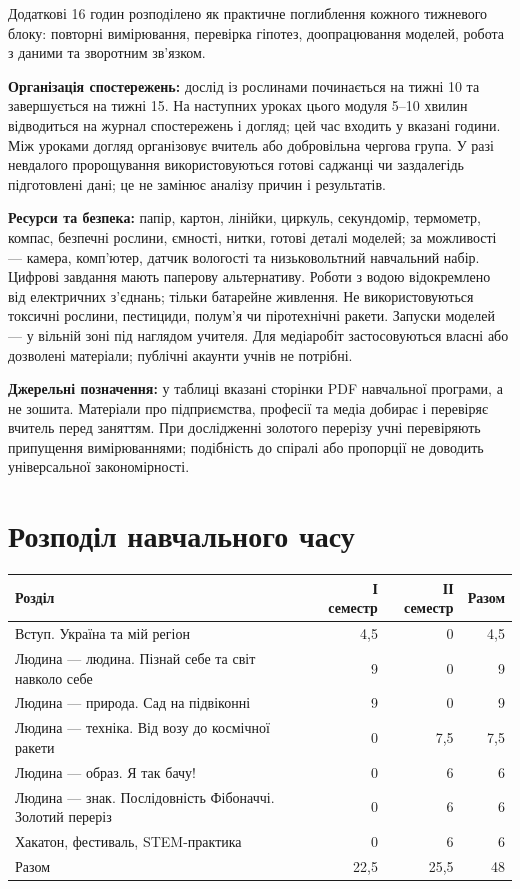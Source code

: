 \documentclass[10pt,a4paper,landscape]{article}
\begin{document}
Додаткові 16 годин розподілено як практичне поглиблення кожного тижневого блоку: повторні вимірювання, перевірка гіпотез, доопрацювання моделей, робота з даними та зворотним зв’язком.

\textbf{Організація спостережень:} дослід із рослинами починається на тижні 10 та завершується на тижні 15. На наступних уроках цього модуля 5--10 хвилин відводиться на журнал спостережень і догляд; цей час входить у вказані години. Між уроками догляд організовує вчитель або добровільна чергова група. У разі невдалого пророщування використовуються готові саджанці чи заздалегідь підготовлені дані; це не замінює аналізу причин і результатів.

\textbf{Ресурси та безпека:} папір, картон, лінійки, циркуль, секундомір, термометр, компас, безпечні рослини, ємності, нитки, готові деталі моделей; за можливості — камера, комп’ютер, датчик вологості та низьковольтний навчальний набір. Цифрові завдання мають паперову альтернативу. Роботи з водою відокремлено від електричних з’єднань; тільки батарейне живлення. Не використовуються токсичні рослини, пестициди, полум’я чи піротехнічні ракети. Запуски моделей — у вільній зоні під наглядом учителя. Для медіаробіт застосовуються власні або дозволені матеріали; публічні акаунти учнів не потрібні.

\textbf{Джерельні позначення:} у таблиці вказані сторінки PDF навчальної програми, а не зошита. Матеріали про підприємства, професії та медіа добирає і перевіряє вчитель перед заняттям. При дослідженні золотого перерізу учні перевіряють припущення вимірюваннями; подібність до спіралі або пропорції не доводить універсальної закономірності.
\newpage
\section*{Розподіл навчального часу}
\begin{tabular}{P{155mm}rrr}
\toprule Розділ & І семестр & ІІ семестр & Разом \\\midrule
Вступ. Україна та мій регіон & 4,5 & 0 & 4,5 \\
Людина — людина. Пізнай себе та світ навколо себе & 9 & 0 & 9 \\
Людина — природа. Сад на підвіконні & 9 & 0 & 9 \\
Людина — техніка. Від возу до космічної ракети & 0 & 7,5 & 7,5 \\
Людина — образ. Я так бачу! & 0 & 6 & 6 \\
Людина — знак. Послідовність Фібоначчі. Золотий переріз & 0 & 6 & 6 \\
Хакатон, фестиваль, STEM-практика & 0 & 6 & 6 \\
\midrule Разом & 22,5 & 25,5 & 48 \\
\bottomrule\end{tabular}
\end{document}
